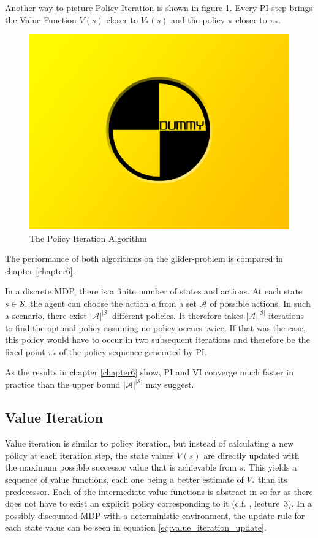Another way to picture Policy Iteration is shown in figure \ref{fig:PI_triangle}. Every PI-step brings the Value Function $V(s)$ closer to $V_*(s)$ and the policy $\pi$ closer to $\pi_*$.

\begin{figure}[h]
	\includegraphics[width=\textwidth]{src/pics/dummy.jpg}
	\caption{The Policy Iteration Algorithm}
	\label{fig:PI_triangle} 
\end{figure}

The performance of both algorithms on the glider-problem is compared in chapter \ref{chapter6}. \bigbreak

In a discrete MDP, there is a finite number of states and actions. At each state $s \in \mathcal{S}$, the agent can choose the action $a$ from a set $\mathcal{A}$ of possible actions. In such a scenario, there exist $|\mathcal{A}|^{|\mathcal{S}|}$ different policies. It therefore takes $|\mathcal{A}|^{|\mathcal{S}|}$ iterations to find the optimal policy assuming no policy occurs twice. If that was the case, this policy would have to occur in two subsequent iterations and therefore be the fixed point $\pi_*$ of the policy sequence generated by PI.

As the results in chapter \ref{chapter6} show, PI and VI converge much faster in practice than the upper bound $|\mathcal{A}|^{|\mathcal{S}|}$ may suggest.


\subsection{Value Iteration}
\label{subsection:VI}
Value iteration is similar to policy iteration, but instead of calculating a new policy at each iteration step, the state values $V(s)$ are directly updated with the maximum possible successor value that is achievable from $s$. This yields a sequence of value functions, each one being a better estimate of $V_*$ than its predecessor. Each of the intermediate value functions is abstract in so far as there does not have to exist an explicit policy corresponding to it (c.f. \cite{Silver2015}, lecture~3). In a possibly discounted MDP with a deterministic environment, the update rule for each state value can be seen in equation \ref{eq:value_iteration_update}.

